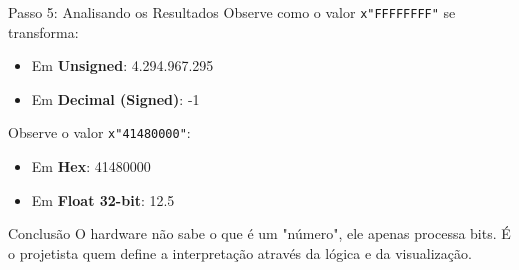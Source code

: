 \documentclass[aspectratio=169]{beamer}
\begin{document}
	\begin{frame}{Passo 5: Analisando os Resultados}
		\justifying
		Observe como o valor \texttt{x"FFFFFFFF"} se transforma:
		\begin{itemize}
			\item Em \textbf{Unsigned}: 4.294.967.295
			\item Em \textbf{Decimal (Signed)}: -1
		\end{itemize}
		
		Observe o valor \texttt{x"41480000"}:
		\begin{itemize}
			\item Em \textbf{Hex}: 41480000
			\item Em \textbf{Float 32-bit}: 12.5
		\end{itemize}
		
		\begin{block}{Conclusão}
			O hardware não sabe o que é um "número", ele apenas processa bits. É o projetista quem define a interpretação através da lógica e da visualização.
		\end{block}
	\end{frame}
\end{document}
